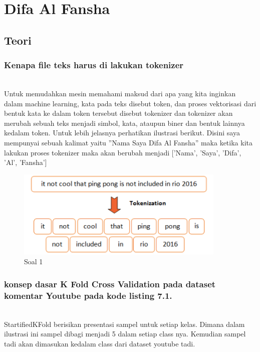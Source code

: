 \section{Difa Al Fansha}

\subsection{Teori}
	\subsubsection{Kenapa file teks harus di lakukan tokenizer}
	\hfill\\
Untuk memudahkan mesin memahami maksud dari apa yang kita inginkan dalam 
machine learning, kata pada teks disebut token, dan proses vektorisasi dari bentuk
kata ke dalam token tersebut disebut tokenizer dan tokenizer akan merubah sebuah
teks menjadi simbol, kata, ataupun biner dan bentuk lainnya kedalam token. Untuk lebih jelasnya perhatikan ilustrasi berikut. Disini saya mempunyai sebuah kalimat yaitu ”Nama Saya Difa Al Fansha” maka ketika kita lakukan proses tokenizer
maka akan berubah menjadi [’Nama’, ’Saya’, 'Difa', 'Al', 'Fansha']

	\begin{figure}[H]
		\begin{center}
		 \includegraphics[width=10cm]{figures/1174076/figures7/teori1.png}
		 \caption{Soal 1}	
		\end{center}
	\end{figure}

	\subsubsection{konsep dasar K Fold Cross Validation pada dataset komentar Youtube pada kode listing 7.1.}
	\hfill\\
StartifiedKFold berisikan presentasi sampel untuk setiap kelas. Dimana dalam
ilustrasi ini sampel dibagi menjadi 5 dalam setiap class nya. Kemudian sampel tadi
akan dimasukan kedalam class dari dataset youtube tadi.	


